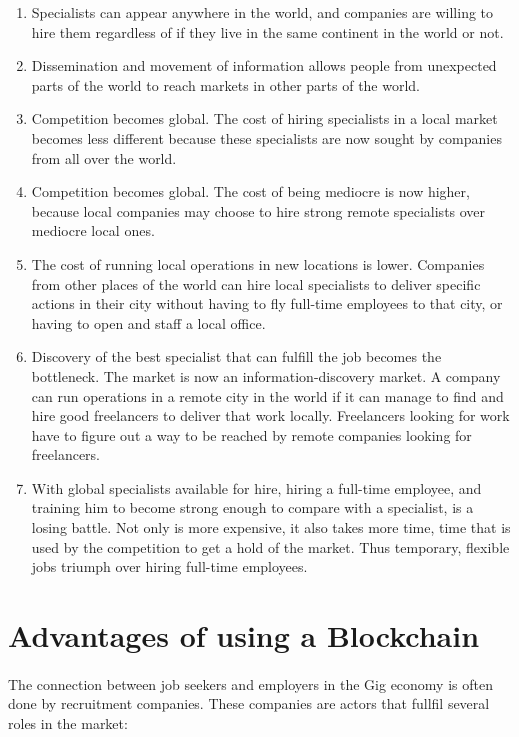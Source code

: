 \documentclass{article}
\begin{document}
\begin{enumerate}
  \item Specialists can appear anywhere in the world, and companies are willing to hire them regardless of if they live in the same continent in the world or not.
  \item Dissemination and movement of information allows people from unexpected parts of the world to reach markets in other parts of the world.
  \item Competition becomes global. The cost of hiring specialists in a local market becomes less different because these specialists are now sought by companies from all over the world.
  \item Competition becomes global. The cost of being mediocre is now higher, because local companies may choose to hire strong remote specialists over mediocre local ones.
  \item The cost of running local operations in new locations is lower. Companies from other places of the world can hire local specialists to deliver specific actions in their city without having to fly full-time employees to that city, or having to open and staff a local office.
  \item Discovery of the best specialist that can fulfill the job becomes the bottleneck. The market is now an information-discovery market. A company can run operations in a remote city in the world if it can manage to find and hire good freelancers to deliver that work locally. Freelancers looking for work have to figure out a way to be reached by remote companies looking for freelancers.
  \item With global specialists available for hire, hiring a full-time employee, and training him to become strong enough to compare with a specialist, is a losing battle. Not only is more expensive, it also takes more time, time that is used by the competition to get a hold of the market. Thus temporary, flexible jobs triumph over hiring full-time employees.

\end{enumerate}

\newpage

\section{Advantages of using a Blockchain}

\paragraph{} The connection between job seekers and employers in the Gig economy is often done by recruitment companies. These companies are actors that fullfil several roles in the market:
\end{document}

